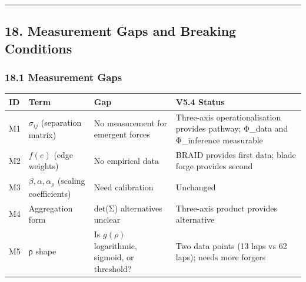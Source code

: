 \documentclass[
  11pt,
]{article}
\newcounter{none} %
\begin{document}
\begin{center}\rule{0.5\linewidth}{0.5pt}\end{center}

\subsection{18. Measurement Gaps and Breaking
Conditions}\label{measurement-gaps-and-breaking-conditions}

\subsubsection{18.1 Measurement Gaps}\label{measurement-gaps}

{\def\LTcaptype{none} %
\begin{longtable}[]{@{}
  >{\raggedright\arraybackslash}p{}
  >{\raggedright\arraybackslash}p{}
  >{\raggedright\arraybackslash}p{}
  >{\raggedright\arraybackslash}p{}@{}}
\toprule\noalign{}
\begin{minipage}[b]{\linewidth}\raggedright
ID
\end{minipage} & \begin{minipage}[b]{\linewidth}\raggedright
Term
\end{minipage} & \begin{minipage}[b]{\linewidth}\raggedright
Gap
\end{minipage} & \begin{minipage}[b]{\linewidth}\raggedright
V5.4 Status
\end{minipage} \\
\midrule\noalign{}
\endhead
\bottomrule\noalign{}
\endlastfoot
M1 & \(\sigma_{ij}\) (separation matrix) & No measurement for emergent
forces & Three-axis operationalisation provides pathway; Φ\_data and
Φ\_inference measurable \\
M2 & \(f(e)\) (edge weights) & No empirical data & BRAID provides first
data; blade forge provides second \\
M3 & \(\beta, \alpha, \alpha_\rho\) (scaling coefficients) & Need
calibration & Unchanged \\
M4 & Aggregation form & det(Σ) alternatives unclear & Three-axis product
provides alternative \\
M5 & ρ shape & Is \(g(\rho)\) logarithmic, sigmoid, or threshold? & Two
data points (13 laps vs 62 laps); needs more forgers \\
\end{longtable}
}
\end{document}
